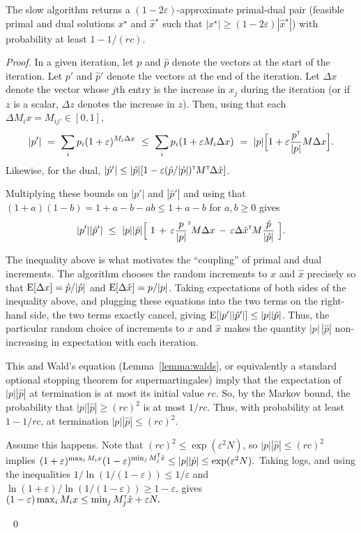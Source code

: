 \documentclass[11pt]{svjour3} \usepackage{fullpage}
\newcommand{\primalOf}[1]{{{#1}}}
\newcommand{\dualOf}[1]{{\hat{#1}}}
\newcommand{\MM}{M}
\newcommand{\xp}{\primalOf x}
\newcommand{\pp}{\primalOf p}
\newcommand{\xd}{\dualOf x}
\newcommand{\pd}{\dualOf p}
\newenvironment{Proof}{\begin{proof}}{{} ~\hfill\hfill\qed~\end{proof}}
\newcommand{\eps}{\varepsilon}
\newcommand{\tran}{^{\scriptscriptstyle \sf T\hspace*{-0.05em}}}
\newcommand{\E}{{\rm E}}
\newcommand{\rows}{r}
\newcommand{\columns}{c}
\begin{document}
\begin{lemma}\label{lemma:slowalg}
The slow algorithm returns a $(1-2\eps)$-approximate primal-dual pair (feasible primal and dual solutions $\xp^\star$ and $\xd^\star$ such that $|\xp^\star| \ge (1-2\eps)|\xd^\star|$) with probability at least $1-1/(\rows\columns)$.
\end{lemma}
\begin{Proof}
In a given iteration, let $\pp$ and $\pd$ denote the vectors at the start of the iteration.  
Let $\pp'$ and $\pd'$ denote the vectors at the end of the iteration.  
Let $\Delta \xp$ denote the vector whose $j$th entry is the increase in $\xp_j$ during the iteration
(or if $z$ is a scalar, $\Delta z$ denotes the increase in $z$).  
Then, using that each $\Delta\MM_i\xp = \MM_{ij'} \in [0,1]$,
\[
|\pp'|
~=~
\sum_i \pp_i(1 + \eps)^{\MM_i \Delta \xp}
~\le~
\sum_i \pp_i(1 + \eps \MM_i \Delta \xp)
~=~
|\pp|\Big[1+\eps \frac{\pp\tran}{|\pp|} \MM \Delta\xp\Big].
\]
Likewise, for the dual,
$|\pd'|
\le
|\pd|[1-\eps (\pd/|\pd|) \tran \MM\tran \Delta\xd
]$.

\smallskip
Multiplying these bounds on $|p'|$ and $|\hat p'|$
and using that $(1+a)(1-b) = 1+a-b-ab \le 1+a-b$ for $a,b\ge 0$ gives
\[|\pp'||\pd'| 
~\le~
|\pp||\pd| \Big[~ 1 
\,+\, \eps \frac{\pp}{|\pp|} \tran \MM \Delta\xp
\,-\, \eps \Delta\xd\tran \MM \frac{\pd}{|\pd|}
~\Big].
\]

The inequality above is what motivates the ``coupling'' of primal and dual increments.
The algorithm chooses the random increments to $\xp$ and $\xd$
precisely so that $\E[\Delta \xp] = \pd/|\pd|$
and $\E[\Delta \xd] = \pp/|\pp|$.
Taking expectations of both sides of the inequality above,
and plugging these equations into the two terms on the right-hand side,
the two terms exactly cancel,
giving \(\E[|\pp'||\pd'|] \le |\pp||\pd|\).
Thus, the particular random choice of increments to $\xp$ and $\xd$
makes the quantity $|\pp|\,|\pd|$ non-increasing in expectation
with each iteration.

This and Wald's equation (Lemma~\ref{lemma:walds}, or equivalently a standard optional stopping theorem for supermartingales) imply that the expectation of $|\pp||\pd|$ at termination is at most its initial value $\rows\columns$.
So, by the Markov bound, the probability 
that $|\pp||\pd| \ge (\rows\columns)^2$ is at most $1/\rows\columns$.
Thus, with probability at least $1-1/\rows\columns$,
at termination $|\pp||\pd| \le (\rows\columns)^2$.

Assume this happens.
Note that  $(\rows\columns)^2 \le \exp({\eps^2 N})$,
so $|\pp||\pd| \le (\rows\columns)^2$ implies
\((1+\eps)^{\max_i \MM_i \xp} (1-\eps)^{\min_j \MM_j\tran \xd} \le |\pp||\pd| \le \exp({\eps^2 N}). \)
Taking logs, and using the inequalities $1/\ln(1/(1-\eps)) \le 1/\eps$
and $\ln(1+\eps)/\ln(1/(1-\eps))\ge 1-\eps$, gives
\((1-\eps) \max_i \MM_i \xp \le \min_j \MM_j\tran \xd + \eps N. \)


\end{Proof}
\end{document}
